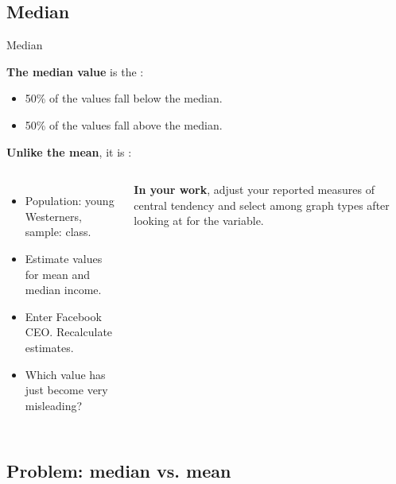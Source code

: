 \documentclass{beamer}
\begin{document}

	\subsection{Median}
	
	\begin{frame}[t]{Median}

	\textbf{The median value} is the :

	\begin{itemize}
		\item 50\% of the values fall below the median.
		\item 50\% of the values fall above the median.
	\end{itemize}

	\textbf{Unlike the mean}, it is :
	
	\begin{columns}[t]
	\vspace{-1em}
	\begin{itemize}
		\item Population: young Westerners, sample: class.
		\item Estimate values for mean and median income.
		\item Enter Facebook CEO. Recalculate estimates.
		\item Which value has just become very misleading?
	\end{itemize}
	\vspace{1em}
	\textbf{In your work}, adjust your reported measures of central tendency and select among graph types after looking at  for the variable.
	\begin{center}\vspace{-2.25em}
	\end{center}
	\end{columns}
	
	\end{frame}
	
	\subsection{Problem: median vs. mean}
	
\end{document}
